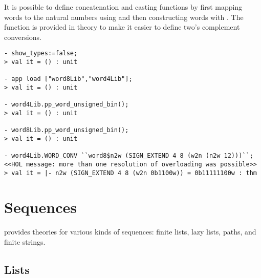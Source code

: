 {It is possible to define concatenation and casting functions by first
mapping words to the natural numbers using  and then
constructing words with .  The function  is
provided in  theory to make it easier to define two's
complement conversions.
\begin{session}
\begin{verbatim}
- show_types:=false;
> val it = () : unit

- app load ["word8Lib","word4Lib"];
> val it = () : unit

- word4Lib.pp_word_unsigned_bin();
> val it = () : unit

- word8Lib.pp_word_unsigned_bin();
> val it = () : unit

- word4Lib.WORD_CONV ``word8$n2w (SIGN_EXTEND 4 8 (w2n (n2w 12)))``;
<<HOL message: more than one resolution of overloading was possible>>
> val it = |- n2w (SIGN_EXTEND 4 8 (w2n 0b1100w)) = 0b11111100w : thm
\end{verbatim}
\end{session}

} %

\section{Sequences}

\HOL{} provides theories for various kinds of sequences: finite lists, lazy lists,
paths, and finite strings.

\subsection{Lists}\label{avra_list}

